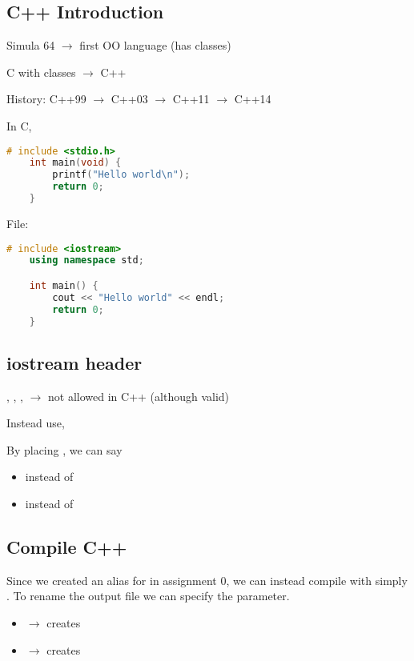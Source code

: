 \subsection{C++ Introduction}
Simula 64 $ \rightarrow $ first OO language (has classes)

C with classes $ \rightarrow $ C++

History: C++99 $ \rightarrow $ C++03 $ \rightarrow $ C++11 $ \rightarrow $ C++14

In C,
\begin{lstlisting}[language = C]
    # include <stdio.h>
    int main(void) {
        printf("Hello world\n");
        return 0;
    }
\end{lstlisting}
File: 
\begin{lstlisting}[language = C++]
    # include <iostream>
    using namespace std;

    int main() {
        cout << "Hello world" << endl;
        return 0;
    }
\end{lstlisting}

\subsection{iostream header}

, , , 
$ \rightarrow $ not allowed in C++ (although valid)

Instead use, 

By placing , we can say
\begin{itemize}
    \item {} instead of 
    \item {} instead of 
\end{itemize}

\subsection{Compile C++}
Since we created an alias for  in assignment 0, we can instead
compile with simply . To rename the output file
we can specify the  parameter.
\begin{itemize}
    \item {} $ \rightarrow $ creates 
    \item {} $ \rightarrow $ creates 
\end{itemize}

